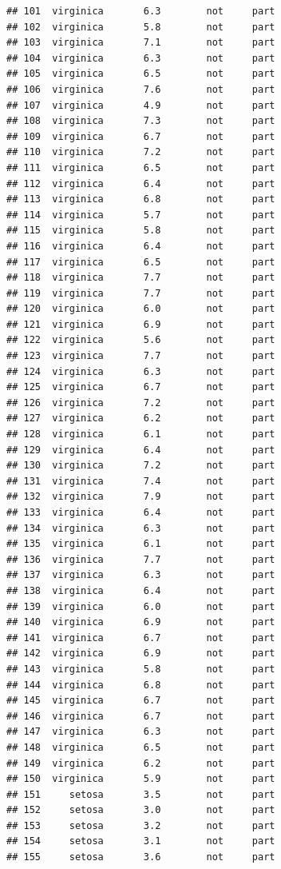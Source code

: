 \documentclass[krantz2]{krantz}\usepackage{knitr}%
\begin{document}
\begin{knitrout}
\begin{kframe}
\begin{verbatim}
## 101  virginica       6.3        not     part
## 102  virginica       5.8        not     part
## 103  virginica       7.1        not     part
## 104  virginica       6.3        not     part
## 105  virginica       6.5        not     part
## 106  virginica       7.6        not     part
## 107  virginica       4.9        not     part
## 108  virginica       7.3        not     part
## 109  virginica       6.7        not     part
## 110  virginica       7.2        not     part
## 111  virginica       6.5        not     part
## 112  virginica       6.4        not     part
## 113  virginica       6.8        not     part
## 114  virginica       5.7        not     part
## 115  virginica       5.8        not     part
## 116  virginica       6.4        not     part
## 117  virginica       6.5        not     part
## 118  virginica       7.7        not     part
## 119  virginica       7.7        not     part
## 120  virginica       6.0        not     part
## 121  virginica       6.9        not     part
## 122  virginica       5.6        not     part
## 123  virginica       7.7        not     part
## 124  virginica       6.3        not     part
## 125  virginica       6.7        not     part
## 126  virginica       7.2        not     part
## 127  virginica       6.2        not     part
## 128  virginica       6.1        not     part
## 129  virginica       6.4        not     part
## 130  virginica       7.2        not     part
## 131  virginica       7.4        not     part
## 132  virginica       7.9        not     part
## 133  virginica       6.4        not     part
## 134  virginica       6.3        not     part
## 135  virginica       6.1        not     part
## 136  virginica       7.7        not     part
## 137  virginica       6.3        not     part
## 138  virginica       6.4        not     part
## 139  virginica       6.0        not     part
## 140  virginica       6.9        not     part
## 141  virginica       6.7        not     part
## 142  virginica       6.9        not     part
## 143  virginica       5.8        not     part
## 144  virginica       6.8        not     part
## 145  virginica       6.7        not     part
## 146  virginica       6.7        not     part
## 147  virginica       6.3        not     part
## 148  virginica       6.5        not     part
## 149  virginica       6.2        not     part
## 150  virginica       5.9        not     part
## 151     setosa       3.5        not     part
## 152     setosa       3.0        not     part
## 153     setosa       3.2        not     part
## 154     setosa       3.1        not     part
## 155     setosa       3.6        not     part

\end{verbatim}
\end{kframe}
\end{knitrout}
\end{document}
